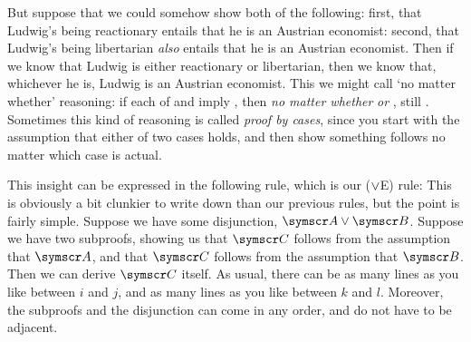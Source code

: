 But suppose that we could somehow show both of the following: first, that Ludwig's being reactionary entails that he is an Austrian economist: second, that Ludwig's being libertarian \emph{also} entails that he is an Austrian economist. Then if we know that Ludwig is either reactionary or libertarian, then we know that, whichever he is, Ludwig is an Austrian economist. This we might call `no matter whether' reasoning: if each of  and  imply , then \emph{no matter whether}  \emph{or} , still . Sometimes this kind of reasoning is called \emph{proof by cases}, since you start with the assumption that either of two cases holds, and then show something follows no matter which case is actual. 


This insight can be expressed in the following rule, which is our  ($\vee$E) rule:
This is obviously a bit clunkier to write down than our previous rules, but the point is fairly simple. Suppose we have some disjunction, $\meta{A} \eor \meta{B}$. Suppose we have two subproofs, showing us that $\meta{C}$ follows from the assumption that $\meta{A}$, and that $\meta{C}$ follows from the assumption that $\meta{B}$. Then we can derive $\meta{C}$ itself. As usual, there can be as many lines as you like between $i$ and $j$, and as many lines as you like between $k$ and $l$. Moreover, the subproofs and the disjunction can come in any order, and do not have to be adjacent.


